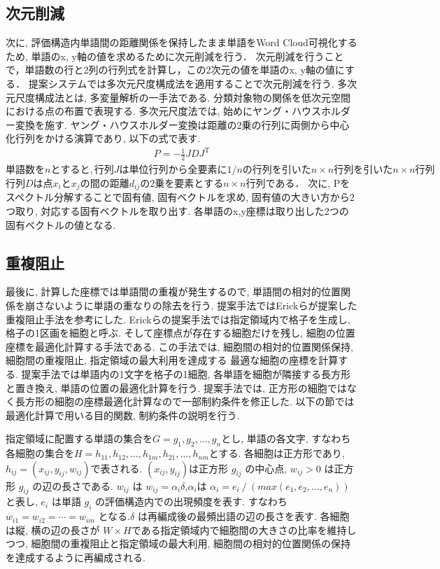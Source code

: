 \documentclass[syuuron]{kuee}
\begin{document}
		\subsection{次元削減}
			次に, 評価構造内単語間の距離関係を保持したまま単語をWord Cloud可視化するため, 単語のx, y軸の値を求めるために次元削減を行う．
			次元削減を行うことで，単語数の行と2列の行列式を計算し，この2次元の値を単語のx, y軸の値にする．
			提案システムでは多次元尺度構成法を適用することで次元削減を行う. 
			多次元尺度構成法とは, 多変量解析の一手法である.  分類対象物の関係を低次元空間における点の布置で表現する. 
			多次元尺度法では, 始めにヤング・ハウスホルダー変換を施す. 
			ヤング・ハウスホルダー変換は距離の2乗の行列に両側から中心化行列をかける演算であり, 以下の式で表す. 
			\begin{eqnarray}
				P = - \frac{1}{2} JDJ^{\mathrm{T}}
			\end{eqnarray}
			$単語数をnとすると, 行列Jは単位行列から全要素に1/nの行列を引いたn \times n行列を引いたn \times n行列$
			$行列Dは点 x_i と x_j の間の距離 d_{ij} の2乗を要素とするn×n行列である．$
			次に, Pをスペクトル分解することで固有値, 固有ベクトルを求め, 固有値の大きい方から2つ取り, 対応する固有ベクトルを取り出す. 
			各単語のx,y座標は取り出した2つの固有ベクトルの値となる. 
			
		\subsection{重複阻止}
			最後に, 計算した座標では単語間の重複が発生するので, 単語間の相対的位置関係を崩さないように単語の重なりの除去を行う. 
			提案手法ではErickらが提案した重複阻止手法を参考にした\cite{or2}. 
			Erickらの提案手法では指定領域内で格子を生成し, 格子の1区画を細胞と呼ぶ. 
			そして座標点が存在する細胞だけを残し, 細胞の位置座標を最適化計算する手法である. 
			この手法では, 細胞間の相対的位置関係保持, 細胞間の重複阻止, 指定領域の最大利用を達成する
			最適な細胞の座標を計算する. 
			提案手法では単語内の1文字を格子の1細胞, 各単語を細胞が隣接する長方形と置き換え, 単語の位置の最適化計算を行う. 
			提案手法では, 正方形の細胞ではなく長方形の細胞の座標最適化計算なので一部制約条件を修正した. 
			以下の節では最適化計算で用いる目的関数, 制約条件の説明を行う. 
			
			指定領域に配置する単語の集合を$G={g_1,g_2,…,g_n}$とし, 単語の各文字, 
			すなわち各細胞の集合を$H={h_{11},h_{12},…,h_{1m},h_{21},…,h_{nm}}$とする. 
			各細胞は正方形であり, $h_{ij}=(x_{ij},y_{ij},w_{ij})$で表される. 
			$(x_{ij},y_{ij})$は正方形 $g_{ij}$  の中心点, $w_{ij}>0$ は正方形 $g_{ij}$ の辺の長さである. 
			$w_{ij}$  は $w_{ij} = \alpha_i \delta $,$ \alpha_i $は $ \alpha_i=  e_i⁄(max⁡(e_1,e_2,…,e_n))$ と表し, 
			$e_i $ は単語 $ g_i $ の評価構造内での出現頻度を表す. 
			すなわち $w_{i1}= w_{i2}=⋯=w_{im}$ となる.$ \delta $ は再編成後の最頻出語の辺の長さを表す. 
			各細胞は縦, 横の辺の長さが $W × H$である指定領域内で細胞間の大きさの比率を維持しつつ, 
			細胞間の重複阻止と指定領域の最大利用, 細胞間の相対的位置関係の保持を達成するように再編成される. 
			
\end{document}
